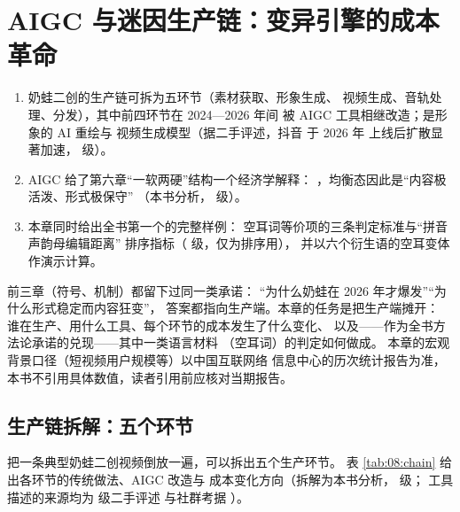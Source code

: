\chapter{AIGC 与迷因生产链：变异引擎的成本革命}\label{ch:08}

\begin{nlkeypoints}
  \begin{enumerate}[label=(\arabic*),leftmargin=2.4em]
    \item 奶蛙二创的生产链可拆为五环节（素材获取、形象生成、
          视频生成、音轨处理、分发），其中前四环节在 2024—2026 年间
          被 AIGC 工具相继改造；是形象的 AI 重绘与
          视频生成模型（据二手评述，抖音  于 2026 年
          上线后扩散显著加速， 级）。
    \item AIGC 给了第六章“一软两硬”结构一个经济学解释：
          ，均衡态因此是“内容极活泼、形式极保守”
          （本书分析， 级）。
    \item 本章同时给出全书第一个的完整样例：
          空耳词等价项的三条判定标准与“拼音声韵母编辑距离”
          排序指标（ 级，仅为排序用），
          并以六个衍生语的空耳变体作演示计算。
  \end{enumerate}
\end{nlkeypoints}

前三章（符号、机制）都留下过同一类承诺：
“为什么奶蛙在 2026 年才爆发”“为什么形式稳定而内容狂变”，
答案都指向生产端。本章的任务是把生产端摊开：
谁在生产、用什么工具、每个环节的成本发生了什么变化、
以及——作为全书方法论承诺的兑现——其中一类语言材料
（空耳词）的判定如何做成。
本章的宏观背景口径（短视频用户规模等）以中国互联网络
信息中心的历次统计报告为准\cite{baidu-index}，
本书不引用具体数值，读者引用前应核对当期报告。

\section{生产链拆解：五个环节}\label{sec:08:chain}

把一条典型奶蛙二创视频倒放一遍，可以拆出五个生产环节。
表 \ref{tab:08:chain} 给出各环节的传统做法、AIGC 改造与
成本变化方向（拆解为本书分析， 级；
工具描述的来源均为  级二手评述
\cite{shoutanji2026naiwa} 与社群考据
\cite{lostmedia2026naiwa}）。

